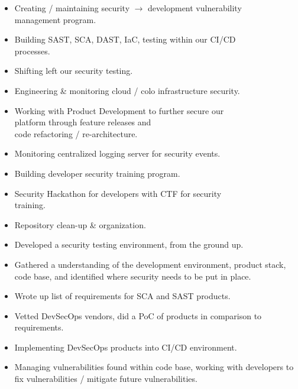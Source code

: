 \documentclass[10pt,a4paper,ragged2e]{rohrbach}
\begin{document}
\begin{paracol}{2}

\begin{itemize}
  \item Creating / maintaining security $\rightarrow$ development vulnerability\\ management program.
  \item Building SAST, SCA, DAST, IaC, testing within our CI/CD\\ processes.
  \item Shifting left our security testing.
  \item Engineering \& monitoring cloud / colo infrastructure security.
  \item Working with Product Development to further secure our\\ platform through feature releases and \\ code refactoring / re-architecture.
  \item Monitoring centralized logging server for security events.
  \item Building developer security training program.
  \item Security Hackathon for developers with CTF for security\\ training.
  \item Repository clean-up & organization.
\end{itemize}

\divider

\begin{itemize}
  \item Developed a security testing environment, from the ground up.
  \item Gathered a understanding of the development environment, product stack, code base, and identified where security needs to be put in place.
  \item Wrote up list of requirements for SCA and SAST products.
  \item Vetted DevSecOps vendors, did a PoC of products in comparison to requirements.
  \item Implementing DevSecOps products into CI/CD environment.
  \item Managing vulnerabilities found within code base, working with developers to fix vulnerabilities / mitigate future vulnerabilities.
\end{itemize}


\end{paracol}
\end{document}
